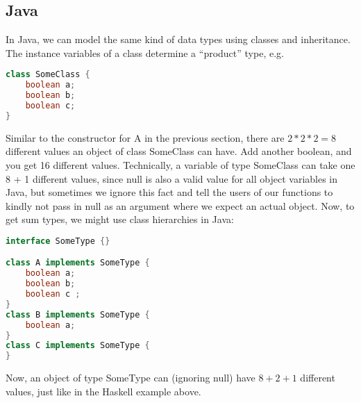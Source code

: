             \subsection*{Java}
            In Java, we can model the same kind of data types using classes and inheritance. The instance
            variables of a class determine a “product” type, e.g.

            \begin{lstlisting}[language=Java]
class SomeClass {
    boolean a;
    boolean b;
    boolean c;
}
            \end{lstlisting}
    Similar to the constructor for A in the previous section, there are $2 * 2 * 2 = 8$ different
    values an object of class SomeClass can have. Add another boolean, and you get 16 different
    values. Technically, a variable of type SomeClass can take one 8 + 1 different values, since
    null is also a valid value for all object variables in Java, but sometimes we ignore this fact
    and tell the users of our functions to kindly not pass in null as an argument where we expect
    an actual object.
    Now, to get sum types, we might use class hierarchies in Java:

    \begin{lstlisting}[language=Java]
interface SomeType {}

class A implements SomeType {
    boolean a;
    boolean b;
    boolean c ;
}
class B implements SomeType {
    boolean a;
}
class C implements SomeType {
}
    \end{lstlisting}
    Now, an object of type SomeType can (ignoring null) have $8 + 2 + 1$ different values,
    just like in the Haskell example above.

